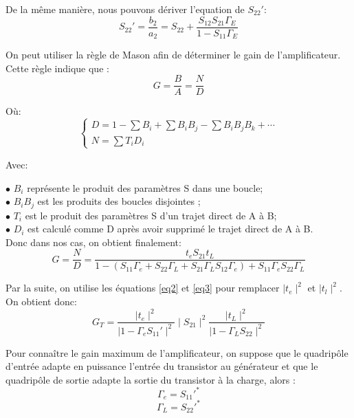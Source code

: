 \documentclass[french]{article}
\begin{document}
De la même manière, nous pouvons dériver l'equation de ${S_{22}}'$:
\begin{equation}
	{S_{22}}'=\frac{b_{2}}{a_{2}}
	=S_{22}+\frac{S_{12}S_{21}\Gamma_{E}}{1-S_{11}\Gamma_{E}}
\end{equation}

On peut utiliser la règle de Mason afin de déterminer le gain de l’amplificateur. Cette règle indique que :
\begin{equation}
	G=\frac{B}{A}=\frac{N}{D}
\end{equation}

Où:
\begin{equation}
	\left\{\begin{matrix}
		D=1-\sum{B_{i}}+\sum{B_{i}B_{j}}-\sum{B_{i}B_{j}B_{k}}+{\cdots}\\ 
		N=\sum{T_{i}D_{i}}
	\end{matrix}\right.
\end{equation}

Avec:

$\bullet$ $B_{i}$ représente le produit des paramètres S dans une boucle;\\
$\bullet$ $B_{i}B_{j}$ est les produits des boucles disjointes ;\\
$\bullet$ $T_{i}$ est le produit des paramètres S d’un trajet direct de A à B;\\
$\bullet$ $D_{i}$ est calculé comme D après avoir supprimé le trajet direct de A à B.\\

Donc dans nos cas, on obtient finalement:
\begin{equation}
	G=\frac{N}{D}=\frac{t_{e}S_{21}t_{L}}{1-\left (S_{11}\Gamma_{e}+S_{22}\Gamma_{L}+S_{21}\Gamma_{L}S_{12}\Gamma_{e}\right)+S_{11}\Gamma_{e}S_{22}\Gamma_{L}}
\end{equation}

Par la suite, on utilise les équations \ref{eq2} et \ref{eq3} pour remplacer $\mid t_{e}\mid ^{2}$ et $\mid t_{l}\mid ^{2}$. On obtient donc:
\begin{equation}
	G_{T}=\frac{\mid t_{e}\mid ^{2}}{\mid 1-\Gamma_{e}{S_{11}}'\mid ^{2}}\mid S_{21}\mid ^{2}\frac{\mid t_{L}\mid ^{2}}{\mid 1-\Gamma_{L}S_{22}\mid^{2}}
\end{equation}

Pour connaître le gain maximum de l’amplificateur, on suppose que le quadripôle d’entrée adapte en puissance l’entrée du transistor au générateur et que le quadripôle de sortie adapte la sortie du transistor à la charge, alors :
\begin{equation}
	\Gamma_{e}={S_{11}}'^\ast
\end{equation}
\begin{equation}
	\Gamma_{L}={S_{22}}'^\ast
\end{equation}
\end{document}
